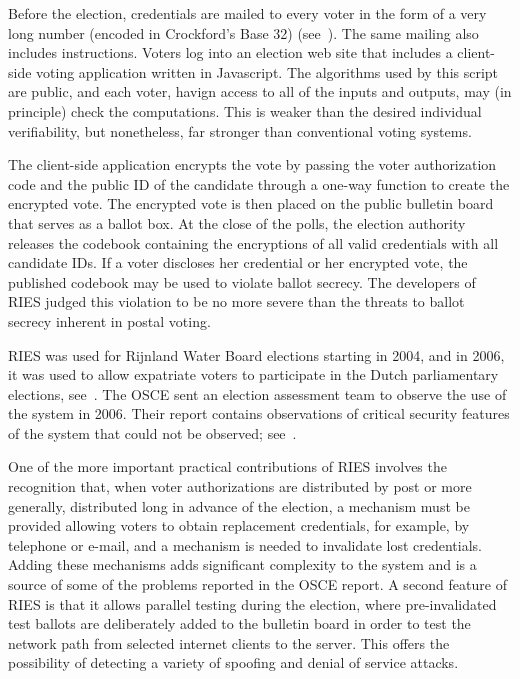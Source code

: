Before the election, credentials are mailed to every voter in the form of a
very long number (encoded in Crockford's Base 32)
(see~\cite{crockford2002}).  The same mailing also includes instructions.
Voters log into an election web site that includes a client-side voting
application written in Javascript.  The algorithms used by this script are
public, and each voter, havign access to all of the inputs and outputs, may
(in principle) check the computations.  This is weaker than the desired
individual verifiability, but nonetheless, far stronger than conventional
voting systems.

The client-side application encrypts the vote by passing the voter
authorization code and the public ID of the candidate through a one-way
function to create the encrypted vote.  The encrypted vote is then placed on
the public bulletin board that serves as a ballot box.  At the close of the
polls, the election authority releases the codebook containing the
encryptions of all valid credentials with all candidate IDs. If a voter
discloses her credential or her encrypted vote, the published codebook may
be used to violate ballot secrecy. The developers of RIES judged this
violation to be no more severe than the threats to ballot secrecy inherent
in postal voting.

RIES was used for Rijnland Water Board elections starting in 2004, and in
2006, it was used to allow expatriate voters to participate in the Dutch
parliamentary elections, see~\cite{gonggrijp2009}. The OSCE sent an election
assessment team to observe the use of the system in 2006.  Their report
contains observations of critical security features of the system that could
not be observed; see~\cite{osce2007}.

One of the more important practical contributions of RIES involves the
recognition that, when voter authorizations are distributed by post or more
generally, distributed long in advance of the election, a mechanism must be
provided allowing voters to obtain replacement credentials, for example, by
telephone or e-mail, and a mechanism is needed to invalidate lost
credentials.  Adding these mechanisms adds significant complexity to the
system and is a source of some of the problems reported in the OSCE report.
A second feature of RIES is that it allows parallel testing during the
election, where pre-invalidated test ballots are deliberately added to the
bulletin board in order to test the network path from selected internet
clients to the server.  This offers the possibility of detecting a variety
of spoofing and denial of service attacks.

